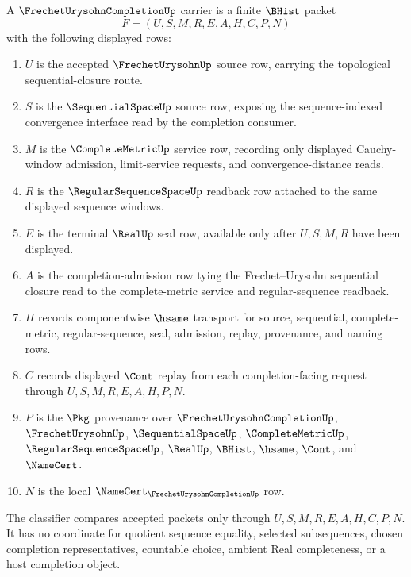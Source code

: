 \begin{definition}
\label{def:frechet-urysohn-completion-carrier}
A $\FrechetUrysohnCompletionUp$ carrier is a finite $\BHist$ packet
$$
F=(U,S,M,R,E,A,H,C,P,N)
$$
with the following displayed rows:
\begin{enumerate}
\item $U$ is the accepted $\FrechetUrysohnUp$ source row, carrying the topological sequential-closure route.
\item $S$ is the $\SequentialSpaceUp$ source row, exposing the sequence-indexed convergence interface read by the completion consumer.
\item $M$ is the $\CompleteMetricUp$ service row, recording only displayed Cauchy-window admission, limit-service requests, and convergence-distance reads.
\item $R$ is the $\RegularSequenceSpaceUp$ readback row attached to the same displayed sequence windows.
\item $E$ is the terminal $\RealUp$ seal row, available only after $U,S,M,R$ have been displayed.
\item $A$ is the completion-admission row tying the Frechet--Urysohn sequential closure read to the complete-metric service and regular-sequence readback.
\item $H$ records componentwise $\hsame$ transport for source, sequential, complete-metric, regular-sequence, seal, admission, replay, provenance, and naming rows.
\item $C$ records displayed $\Cont$ replay from each completion-facing request through $U,S,M,R,E,A,H,P,N$.
\item $P$ is the $\Pkg$ provenance over $\FrechetUrysohnCompletionUp$, $\FrechetUrysohnUp$, $\SequentialSpaceUp$, $\CompleteMetricUp$, $\RegularSequenceSpaceUp$, $\RealUp$, $\BHist$, $\hsame$, $\Cont$, and $\NameCert$.
\item $N$ is the local $\NameCert_{\FrechetUrysohnCompletionUp}$ row.
\end{enumerate}
The classifier compares accepted packets only through $U,S,M,R,E,A,H,C,P,N$. It has no coordinate for quotient sequence equality, selected subsequences, chosen completion representatives, countable choice, ambient Real completeness, or a host completion object.
\end{definition}

